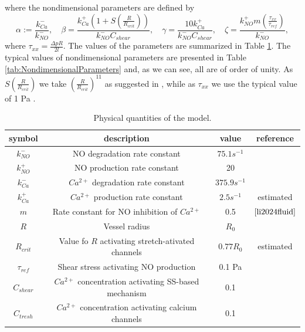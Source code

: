 \documentclass[12pt,a4paper]{article}
\begin{document}
\normalcolor
where the nondimensional parameters are defined by
\begin{equation}
    \alpha := \frac{k_{Ca}^-}{k_{NO}^{-}}, \quad \beta=\frac{k_{Ca}^+\left( 1 + S\left(\frac{R}{R_{crit}}\right)\right)}{k_{NO}^{-} C_{shear}}, \quad
    \gamma=\frac{10 k_{Ca}^+}{k_{NO}^{-} C_{shear}}, \quad
    \zeta = \frac{k_{NO}^+ m \left(\frac{\tau_{xx}}{\tau_{ref}}\right)}{ k_{NO}^{-}},
\end{equation}
where $\tau_{xx}=\frac{\Delta p R}{2 l}$.
The values of the parameters are summarized in Table \ref{tab:Parameters}. The typical values of nondimensional parameters are presented in Table \ref{tab:NondimensionalParameters} and, as we can see, all are of order of unity. As $S\left( \frac{R}{R_{crit}}\right)$ we take $\left( \frac{R}{R_{crit}}\right)^{11}$ as suggested in \cite{kunert2015mechanobiological}, while as $\tau_{xx}$ we use the typical value of 1 Pa \cite{angeli2023biomechanical}.
\begin{table}
\centering
\begin{tabular}{cccc}
  \toprule
  symbol & description & value & reference \\
  \midrule
  $k_{NO}^{-}$ & NO degradation rate constant & $75.1 s^{-1}$ & \cite{li2024fluid} \\ 
  $k_{NO}^{+}$ & NO production rate constant  & 20 & \cite{li2024fluid} \\ 
  $k_{Ca}^{-}$ & $Ca^{2+}$ degradation rate constant & $375.9 s^{-1}$ & \cite{li2024fluid} \\
  $k_{Ca}^{+}$ & $Ca^{2+}$ production rate constant & $2.5 s^{-1}$ & estimated \\
  $m$          & Rate constant for NO inhibition of $Ca^{2+}$ & 0.5 & $ \cite{li2024fluid}$ \\
  $R$ & Vessel radius & $R_0$& \\
  $R_{crit}$   & Value fo $R$ activating stretch-ativated channels & $0.77 R_0$ & estimated \\
  $\tau_{ref}$ & Shear stress activating NO production & 0.1 Pa & \cite{angeli2023biomechanical} \\ 
  $C_{shear}$  & $Ca^{2+}$ concentration activating SS-based mechanism & 0.1 &  \\
  $C_{tresh}$  & $Ca^{2+}$ concentration activating calcium channels & 0.1 & \cite{li2024fluid} \\
  \bottomrule
\end{tabular}
\caption{Physical quantities of the model.}
\label{tab:Parameters}
\end{table}
\end{document}
